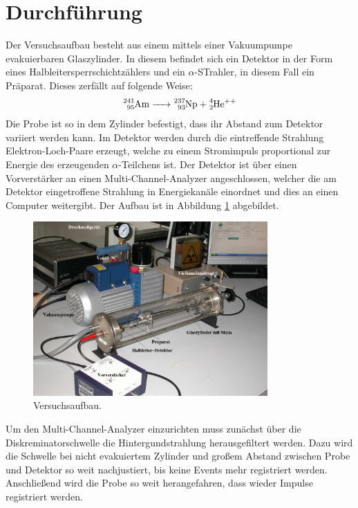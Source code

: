 \section{Durchführung}
\label{sec:Durchführung}
Der Versuchsaufbau besteht aus einem mittels einer Vakuumpumpe evakuierbaren Glaszylinder. In diesem befindet sich ein Detektor in der Form eines Halbleitersperrschichtzählers und ein $\alpha$-STrahler, in 
diesem Fall ein  Präparat. Dieses zerfällt auf folgende Weise:
\begin{equation}
	\ce{^{241}_{95}Am -> ^{237}_{93}Np + ^4_2He^{++}}
\end{equation}
Die Probe ist so in dem Zylinder befestigt, dass ihr Abstand zum Detektor variiert werden kann.
Im Detektor werden durch die eintreffende Strahlung Elektron-Loch-Paare erzeugt, welche zu einem Stromimpuls proportional zur Energie des erzeugenden $\alpha$-Teilchens ist.
Der Detektor ist über einen Vorverstärker an einen Multi-Channel-Analyzer angeschlossen, welcher die am Detektor eingetroffene Strahlung in Energiekanäle einordnet und dies an einen Computer weitergibt.
Der Aufbau ist in Abbildung \ref{fig:aufbau} abgebildet.
\begin{figure}[H]
  \centering
  \includegraphics[width=0.8\textwidth]{content/aufbau.png}
  \caption{Versuchsaufbau.\cite{v701}}
  \label{fig:aufbau}
\end{figure}
\noindent
Um den Multi-Channel-Analyzer einzurichten muss zunächst über die Diskreminatorschwelle die Hintergundstrahlung herausgefiltert werden. Dazu wird die Schwelle bei nicht evakuiertem Zylinder und großem 
Abstand zwischen Probe und Detektor so weit nachjustiert, bis keine Events mehr registriert werden. Anschließend wird die Probe so weit herangefahren, dass wieder Impulse registriert werden.
